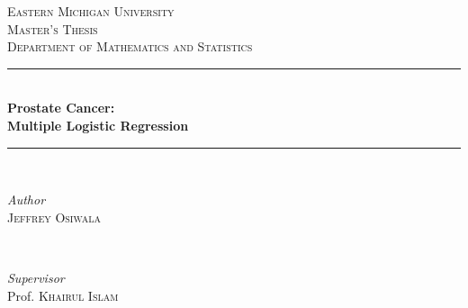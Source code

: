 \documentclass[11pt, a4paper]{article}
\begin{document}

\begin{titlepage} %
	\newcommand{\HRule}{\rule{\linewidth}{0.5mm}} %
	\center %
	
	\textsc{\LARGE Eastern Michigan University}\\[1.5cm] %
	\textsc{\Large Master's Thesis}\\[0.5cm] %
	\textsc{\large Department of Mathematics and Statistics}\\[0.5cm] %

	
	\HRule\\[0.4cm]
	{\huge\bfseries Prostate Cancer: \\ [0.5cm] Multiple Logistic Regression}\\[0.4cm] %
	\HRule\\[1.5cm]
	
	
	\begin{minipage}{0.4\textwidth}
		\begin{flushleft}
			\large
			\textit{Author}\\
			\textsc{Jeffrey Osiwala} %
		\end{flushleft}
	\end{minipage}
	~
	\begin{minipage}{0.4\textwidth}
		\begin{flushright}
			\large
			\textit{Supervisor}\\
			Prof. \textsc{Khairul Islam} %
		\end{flushright}
	\end{minipage}
	
	

\end{titlepage}
\end{document}
